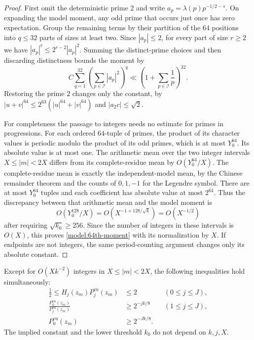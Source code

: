 \begin{proof}
First omit the deterministic prime $2$ and write
$a_p=\lambda(p)p^{-1/2-s}$.  On expanding the model moment, any odd
prime that occurs just once has zero expectation.  Group the remaining
terms by their partition of the $64$ positions into $q\le32$ parts of
sizes at least two.  Since $|a_p|\le2$, for every part of size $r\ge2$
we have $|a_p|^r\le2^{r-2}|a_p|^2$.  Summing the distinct-prime choices
and then discarding distinctness bounds the moment by
\[
 C\sum_{q=1}^{32}\left(\sum_{p\in\mathcal I}|a_p|^2\right)^q
 \ll\left(1+\sum_{p\in\mathcal I}\frac1p\right)^{32}.
\]
Restoring the prime $2$ changes only the constant, by
$|u+v|^{64}\le2^{63}(|u|^{64}+|v|^{64})$ and $|a_2c|\le\sqrt2$.

For completeness the passage to integers needs no estimate for primes
in progressions.  For each ordered $64$-tuple of primes, the product
of its character values is periodic modulo the product of its odd
primes, which is at most $Y_0^{64}$.  Its absolute value is at most one.
The arithmetic mean over the two integer intervals $X\le|m|<2X$ differs from its
complete-residue mean by $O(Y_0^{64}/X)$.  The complete-residue mean is
exactly the independent-model mean, by the Chinese remainder theorem
and the counts of $0,1,-1$ for the Legendre symbol.  There are at most
$Y_0^{64}$ tuples and each coefficient has absolute value at most
$2^{64}$.  Thus the discrepancy between that arithmetic mean and the
model moment is
\[
 O(Y_0^{128}/X)=O(X^{-1+128/\sqrt k})=O(X^{-1/2})
\]
after requiring $\sqrt{k_0}\ge256$.  Since the number of integers in
these intervals is $O(X)$, this proves \eqref{model:64th-moment} with
its normalization by $X$.  If endpoints are not integers, the same
period-counting argument changes only its absolute constant.
\end{proof}

\begin{proposition}\label{model:good-event}
Except for $O(Xk^{-2})$ integers in $X\le|m|<2X$, the following
inequalities hold simultaneously:
\begin{align}
 \frac12\le H_j(z_m)P_j^{\mathrm{eu}}(z_m)&\le2
                         &&(0\le j\le J),
 \label{model:good-mollifier}\\
 \frac{P_0^{\mathrm{eu}}(z_m)}{P_j^{\mathrm{eu}}(z_m)}
   &\ge2^{-jk/8} &&(1\le j\le J),
 \label{model:good-ratio}\\
 P_0^{\mathrm{eu}}(z_m)&\ge2^{-Jk/8}.
 \label{model:good-full-product}
\end{align}
The implied constant and the lower threshold $k_0$ do not depend on
$k,j,X$.
\end{proposition}

